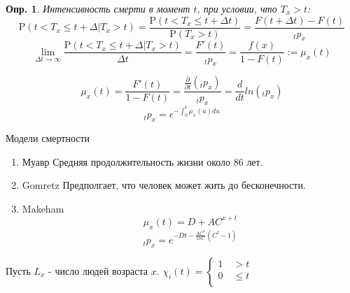 \documentclass[10pt]{article}
\newtheorem{definition}{Опр.}
\theoremstyle{theorem}
\def\P{
    \mathrm{P}
}
\begin{document}
    \begin{definition}
        Интенсивность смерти в момент $t$, при условии, что $T_x > t$:
        $$\P(t < T_x \leq t + \Delta | T_x > t) = \frac{\P(t < T_x \leq t + \Delta t)}{\P(T_x > t)} = \frac{F(t + \Delta t) - F(t)}{{}_tp_x}$$
        $$\lim_{\Delta t \to \infty} \frac{\P(t < T_x \leq t + \Delta | T_x > t)}{\Delta t} = \frac{F'(t)}{{}_tp_x} = \frac{f(x)}{1-F(t)} := \mu_x(t) $$
    \end{definition}
        $$\mu_x(t) = \frac{F'(t)}{1-F(t)} = \frac{\frac{\partial}{\partial t}({}_tp_x)}{{}_tp_x} = \frac{d}{dt} ln({}_tp_x)$$
        $$\boxed{{}_tp_x = e^{-\int_0^t \mu_x(u) du} }$$

    Модели смертности
    \begin{enumerate}
        \item Муавр
        Средняя продолжительность жизни около 86 лет.
        \item Gomretz
        Предполгает, что человек может жить до бесконечности.
        \item Makeham
        $$\mu_x(t) = D + AC^{x+t}$$
        $${}_t{}p_x = e^{-Dt - \frac{AC^x}{lnC}(C^t - 1)}$$
    \end{enumerate}
    Пусть $L_x$ - число людей возраста $x$.
    $\chi_i(t) = \begin{cases}
        1 \quad > t     \\
        0 \quad \leq t  \\
    \end{cases} $
\end{document}
